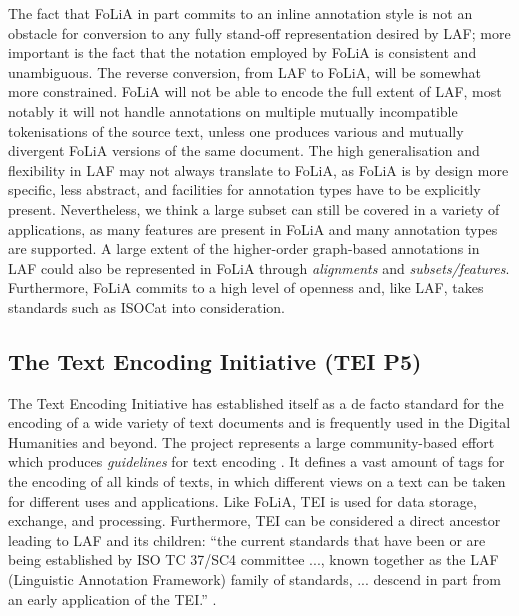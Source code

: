 \documentclass[a4paper,10pt,twoside]{article}
\begin{document}
The fact that FoLiA in part commits to an inline annotation style is not an
obstacle for conversion to any fully stand-off representation desired by LAF;
more important is the fact that the notation employed by FoLiA is consistent
and unambiguous. The reverse conversion, from LAF to FoLiA, will be somewhat
more constrained. FoLiA will not be able to encode the full extent of LAF, most
notably it will not handle annotations on multiple mutually incompatible
tokenisations of the source text, unless one produces various and mutually
divergent FoLiA versions of the same document. The high generalisation and
flexibility in LAF may not always translate to FoLiA, as FoLiA is by design
more specific, less abstract, and facilities for annotation types have to be
explicitly present. Nevertheless, we think a large subset can still be covered
in a variety of applications, as many features are present in FoLiA and many
annotation types are supported. A large extent of the higher-order graph-based
annotations in LAF could also be represented in FoLiA through \emph{alignments}
and \emph{subsets/features}. Furthermore, FoLiA commits to a high level of
openness and, like LAF, takes standards such as ISOCat \cite{ISOCAT} into
consideration. %


\subsection{The Text Encoding Initiative (TEI P5)}

The Text Encoding Initiative has established itself as a de facto standard for
the encoding of a wide variety of text documents and is frequently used in the
Digital Humanities and beyond. The project represents a large community-based
effort which produces \emph{guidelines} for text encoding \cite{TEI}. It
defines a vast amount of tags for the encoding of all kinds of texts, in which
different views on a text can be taken for different uses and applications.
Like FoLiA, TEI is used for data storage, exchange, and processing.
Furthermore, TEI can be considered a direct ancestor leading to LAF and its
children: ``the current standards that have been or are being established by ISO
TC 37/SC4 committee ..., known together as the LAF (Linguistic Annotation Framework) family of standards, ... descend
in part from an early application of the TEI.'' \cite{TEICORPUSANNOT}. 
\end{document}
